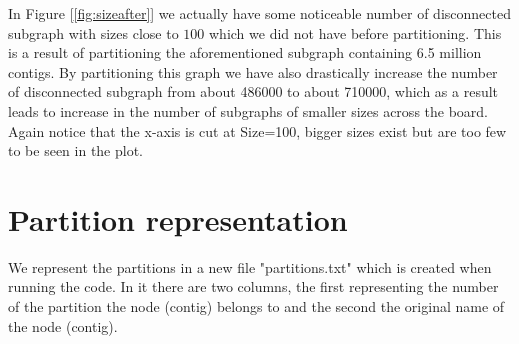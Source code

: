 \documentclass[a4paper,10pt]{article}
\newcommand\bref[1]{[\ref{#1}]}
\begin{document}
In Figure \bref{fig:sizeafter} we actually have some noticeable number of disconnected subgraph with sizes close to $100$ which we did not have before partitioning. This is a result of partitioning the aforementioned subgraph containing 6.5 million contigs. By partitioning this graph we have also drastically increase the number of disconnected subgraph from about 486000 to about 710000, which as a result leads to increase in the number of subgraphs of smaller sizes across the board. Again notice that the x-axis is cut at Size=100, bigger sizes exist but are too few to be seen in the plot.

\bigskip

\section{Partition representation}

We represent the partitions in a new file "partitions.txt" which is created when running the code. In it there are two columns, the first representing the number of the partition the node (contig) belongs to and the second the original name of the node (contig).
\end{document}
